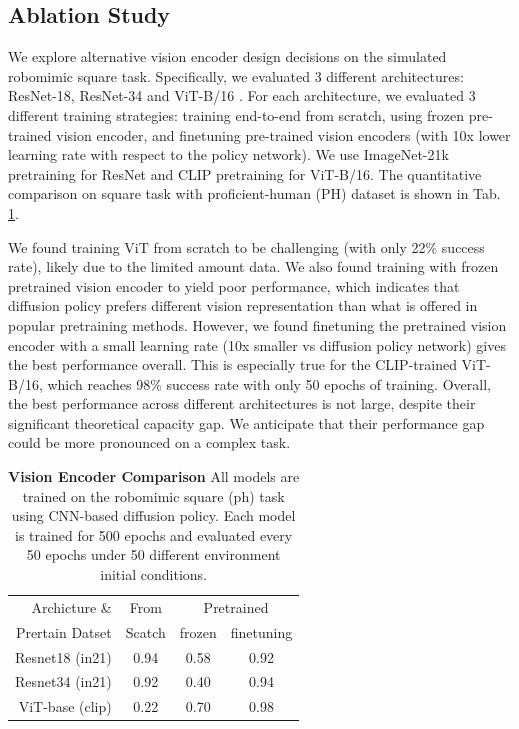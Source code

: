\documentclass[Afour,sageh,times]{sagej}
\begin{document}
\subsection{Ablation Study}
\label{sec:arch_ablation}
We explore alternative vision encoder design decisions on the simulated robomimic square task.
Specifically, we evaluated 3 different architectures:
ResNet-18, ResNet-34 \cite{resnet}
and ViT-B/16 \cite{dosovitskiy2020image}.
For each architecture, we evaluated 3 different training strategies:
training end-to-end from scratch,
using frozen pre-trained vision encoder,
and finetuning pre-trained vision encoders (with 10x lower learning rate with respect to the policy network).
We use ImageNet-21k \cite{ridnik2021imagenet21k} pretraining for ResNet and CLIP \cite{radford2021learning} pretraining for ViT-B/16.
The quantitative comparison on square task with proficient-human (PH) dataset is shown in Tab. \ref{tab:ablation_vision_encorder}.

We found training ViT from scratch to be challenging (with only 22\% success rate), likely due to the limited amount data.
We also found training with frozen pretrained vision encoder to yield poor performance, which indicates that diffusion policy prefers different vision representation than what is offered in popular pretraining methods.
However, we found finetuning the pretrained vision encoder with a small learning rate (10x smaller vs diffusion policy network) gives the best performance overall. This is especially true for the CLIP-trained ViT-B/16, which reaches 98\% success rate with only 50 epochs of training.
Overall, the best performance across different architectures is not large, despite their significant theoretical capacity gap. We anticipate that their performance gap could be more pronounced on a complex task.

\begin{table}
\centering
\begin{tabular}{r|c|cc}
\toprule
Archicture \& & From & \multicolumn{2}{c}{Pretrained} \\
Prertain Datset& Scatch & frozen & finetuning \\
\midrule
Resnet18 (in21) & 0.94   & 0.58      & 0.92             \\
Resnet34 (in21)& 0.92   & 0.40      & 0.94             \\
ViT-base (clip)& 0.22   & 0.70      & 0.98             \\
\bottomrule
\end{tabular}
\caption{\textbf{Vision Encoder Comparison} All models are trained on the robomimic square (ph) task using CNN-based diffusion policy. Each model is trained for 500 epochs and evaluated every 50 epochs under 50 different environment initial conditions.}
\label{tab:ablation_vision_encorder}
\vspace{-2mm}
\end{table}
\end{document}
